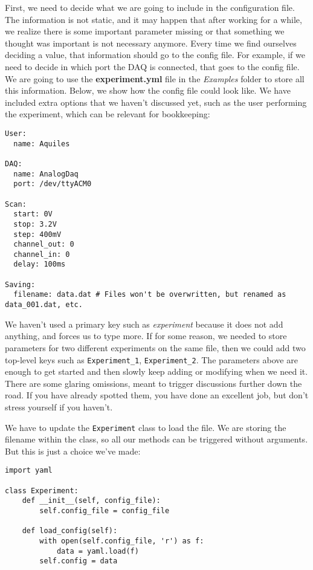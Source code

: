 First, we need to decide what we are going to include in the configuration file. The information is not static, and it may happen that after working for a while, we realize there is some important parameter missing or that something we thought was important is not necessary anymore. Every time we find ourselves deciding a value, that information should go to the config file. For example, if we need to decide in which port the DAQ is connected, that goes to the config file. We are going to use the \textbf{experiment.yml} file in the \emph{Examples} folder to store all this information. Below, we show how the config file could look like. We have included extra options that we haven't discussed yet, such as the user performing the experiment, which can be relevant for bookkeeping:

\begin{verbatim}
User:
  name: Aquiles

DAQ:
  name: AnalogDaq
  port: /dev/ttyACM0

Scan:
  start: 0V
  stop: 3.2V
  step: 400mV
  channel_out: 0
  channel_in: 0
  delay: 100ms

Saving:
  filename: data.dat # Files won't be overwritten, but renamed as data_001.dat, etc.
\end{verbatim}

We haven't used a primary key such as \emph{experiment} because it does not add anything, and forces us to type more. If for some reason, we needed to store parameters for two different experiments on the same file, then we could add two top-level keys such as \texttt{Experiment\_1}, \texttt{Experiment\_2}. The parameters above are enough to get started and then slowly keep adding or modifying when we need it. There are some glaring omissions, meant to trigger discussions further down the road. If you have already spotted them, you have done an excellent job, but don't stress yourself if you haven't.

We have to update the \texttt{Experiment} class to load the file. We are storing the filename within the class, so all our methods can be triggered without arguments. But this is just a choice we've made:

\begin{verbatim}
import yaml

class Experiment:
    def __init__(self, config_file):
        self.config_file = config_file

    def load_config(self):
        with open(self.config_file, 'r') as f:
            data = yaml.load(f)
        self.config = data
\end{verbatim}

